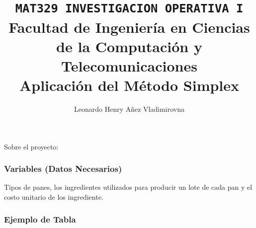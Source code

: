 \documentclass[10pt,letterpaper]{article}
\title{
{\footnotesize \texttt{MAT329 INVESTIGACION OPERATIVA I}} \\ \vspace{-0.25cm}
{\small Facultad de Ingeniería en Ciencias de la Computación y Telecomunicaciones}\\
Aplicación del Método Simplex
}
\author{
Leonardo Henry Añez Vladimirovna
}
\date{}
\begin{document}
\maketitle
Sobre el proyecto:
\subsubsection*{Variables (Datos Necesarios)}
Tipos de panes, los ingredientes utilizados para producir un lote de cada pan y el costo unitario de los ingrediente.
\subsubsection*{Ejemplo de Tabla}
\end{document}
